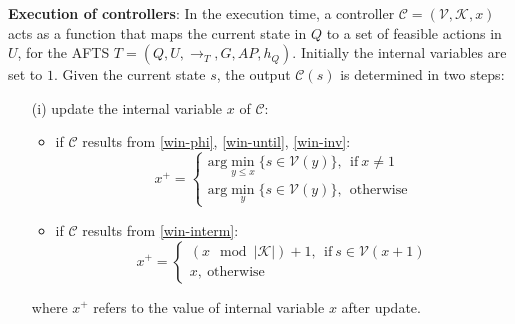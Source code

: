 
\begin{definition} \textbf{Execution of controllers}:
	In the execution time, a controller $ \mathcal{C}=(\mathcal{V},\mathcal{K},x) $ acts as a function that maps the current state in $ Q $ to a set of feasible actions in $ U $, for the AFTS $ T = (Q,U,\rightarrow_T, G,AP,h_Q)$. Initially the internal variables are set to $ 1 $. Given the current state $ s $, the output $ \mathcal{C}(s) $ is determined in two steps:
	\begin{itemize}
		\item[(i)] update the internal variable $ x $ of $ \mathcal{C} $: 
		\begin{itemize}
			\item 	if $ \mathcal{C} $ results from \eqref{win-phi}, \eqref{win-until}, \eqref{win-inv}:
			\begin{displaymath}
			x^+ =	\begin{cases}
			\text{arg}\min_{y\leq x}\{s\in \mathcal{V}(y)\},\ \ \text{if}\ x\not=1\\
			\text{arg}\min_{y}\{s\in \mathcal{V}(y)\},\ \ \text{otherwise}
			\end{cases}
			\end{displaymath}
			\item  if $ \mathcal{C} $ results from \eqref{win-interm}: %
			\begin{displaymath}
			x^+ = \begin{cases}
			(x\mod\vert\mathcal{K}\vert) + 1,\ \ \text{if}\ s\in \mathcal{V}(x+1)\\
			x,\ \text{otherwise}
			\end{cases}
			\end{displaymath}
		\end{itemize}
		where $ x^+ $ refers to the value of internal variable $ x $ after update.
		

\end{itemize}
\end{definition}
